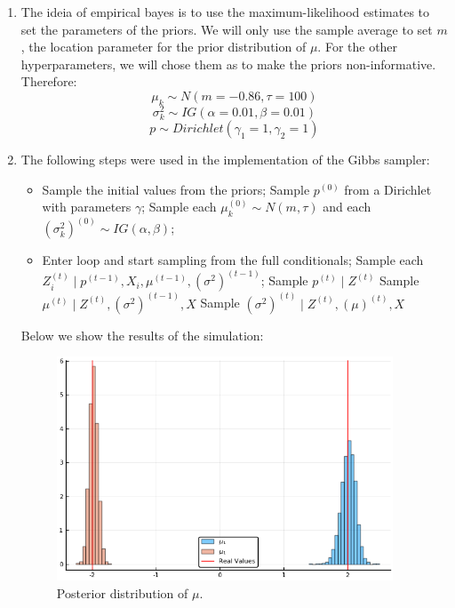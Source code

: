 \documentclass[12pt,letterpaper]{article}
\begin{document}
\begin{enumerate}[leftmargin=!,labelindent=5pt]
\item The ideia of empirical bayes
is to use the maximum-likelihood estimates
to set the parameters of the priors. We will only use the
sample average to set $m$, the location parameter for the
prior distribution of $\mu$. For the other hyperparameters,
we will chose them as to make the priors non-informative. Therefore:
$$\mu_k \sim N(m = -0.86,\tau = 100)$$
$$\sigma^2_k \sim IG(\alpha = 0.01,\beta = 0.01)$$
$$p \sim Dirichlet(\gamma_1 =1,\gamma_2 = 1)$$

\item The following steps were used in the implementation of the Gibbs
sampler:

\begin{itemize}
	\item Sample the initial values from the priors;	
	\subitem Sample $p^{(0)}$ from a Dirichlet with parameters $\gamma$;
	\subitem Sample each $\mu_k^{(0)} \sim N(m, \tau)$ and each
$(\sigma_k^2)^{(0)} \sim IG(\alpha, \beta)$;

\item Enter loop and start sampling from the full conditionals;
	\subitem Sample each $Z_i^{(t)} \mid
	p^{(t-1)},X_i,\mu^{(t-1)},(\sigma^2)^{(t-1)}$;
	\subitem Sample $p^{(t)} \mid Z^{(t)}$
	\subitem Sample $\mu^{(t)} \mid Z^{(t)},(\sigma^2)^{(t-1)},X$
	\subitem Sample $(\sigma^2)^{(t)}
	\mid Z^{(t)},(\mu)^{(t)},X$
\end{itemize}

Below we show the results of the simulation:

\begin{figure}[H]
    \centering
    \includegraphics[width=10cm]{images/Ex8_1.png}
    \caption{Posterior distribution of $\mu$.
    }
    \label{fig:2}
\end{figure}


\end{enumerate}
\end{document}
